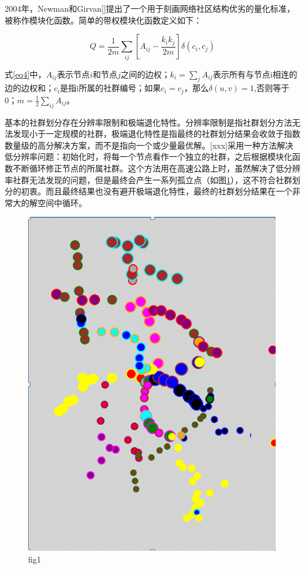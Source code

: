 			2004年，Newman和Girvan[]提出了一个用于刻画网络社区结构优劣的量化标准，被称作模块化函数。简单的带权模块化函数定义如下：

			\begin{equation}
			Q = \frac{1}{{2m}}\sum\limits_{ij} {[{A_{ij}} - \frac{{{k_i}{k_j}}}{{2m}}]\delta ({c_i},{c_j})}
			\label{eq4}
			\end{equation}

			式\ref{eq4}中，$A_{ij}$表示节点$i$和节点$j$之间的边权；$k_i=\sum\limits_{j} {A_{ij}}$表示所有与节点i相连的边的边权和；$c_i$是指i所属的社群编号；如果$c_i=c_j$，那么$\delta (u,v)=1$,否则等于0；$m=\frac{1}{{2}}\sum\limits_{ij} {A_{ij}}$。

			基本的社群划分存在分辨率限制和极端退化特性。分辨率限制是指社群划分方法无法发现小于一定规模的社群，极端退化特性是指最终的社群划分结果会收敛于指数数量级的高分解决方案，而不是指向一个或少量最优解。[xxx]采用一种方法解决低分辨率问题：初始化时，将每一个节点看作一个独立的社群，之后根据模块化函数不断循环修正节点的所属社群。这个方法用在高速公路上时，虽然解决了低分辨率社群无法发现的问题，但是最终会产生一系列孤立点（如图\ref{gulidian}），这不符合社群划分的初衷。而且最终结果也没有避开极端退化特性，最终的社群划分结果在一个非常大的解空间中循环。

			\begin{figure}[h]
			\centering
					\begin{minipage}{0.8\linewidth}
						\centering
						\includegraphics[width=4.4in]{picture/liuliangbianquan}
						\caption{fig1}
						\label{gulidian}
					\end{minipage}
			\end{figure}

